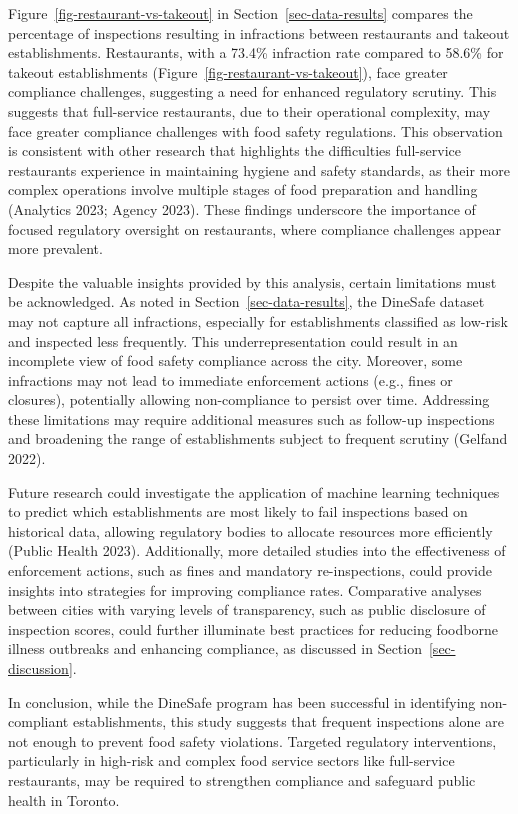 \documentclass[
  letterpaper,
  DIV=11,
  numbers=noendperiod]{scrartcl}
\begin{document}
Figure~\ref{fig-restaurant-vs-takeout} in Section~\ref{sec-data-results}
compares the percentage of inspections resulting in infractions between
restaurants and takeout establishments. Restaurants, with a 73.4\%
infraction rate compared to 58.6\% for takeout establishments
(Figure~\ref{fig-restaurant-vs-takeout}), face greater compliance
challenges, suggesting a need for enhanced regulatory scrutiny. This
suggests that full-service restaurants, due to their operational
complexity, may face greater compliance challenges with food safety
regulations. This observation is consistent with other research that
highlights the difficulties full-service restaurants experience in
maintaining hygiene and safety standards, as their more complex
operations involve multiple stages of food preparation and handling
(Analytics 2023; Agency 2023). These findings underscore the importance
of focused regulatory oversight on restaurants, where compliance
challenges appear more prevalent.

Despite the valuable insights provided by this analysis, certain
limitations must be acknowledged. As noted in
Section~\ref{sec-data-results}, the DineSafe dataset may not capture all
infractions, especially for establishments classified as low-risk and
inspected less frequently. This underrepresentation could result in an
incomplete view of food safety compliance across the city. Moreover,
some infractions may not lead to immediate enforcement actions (e.g.,
fines or closures), potentially allowing non-compliance to persist over
time. Addressing these limitations may require additional measures such
as follow-up inspections and broadening the range of establishments
subject to frequent scrutiny (Gelfand 2022).

Future research could investigate the application of machine learning
techniques to predict which establishments are most likely to fail
inspections based on historical data, allowing regulatory bodies to
allocate resources more efficiently (Public Health 2023). Additionally,
more detailed studies into the effectiveness of enforcement actions,
such as fines and mandatory re-inspections, could provide insights into
strategies for improving compliance rates. Comparative analyses between
cities with varying levels of transparency, such as public disclosure of
inspection scores, could further illuminate best practices for reducing
foodborne illness outbreaks and enhancing compliance, as discussed in
Section~\ref{sec-discussion}.

In conclusion, while the DineSafe program has been successful in
identifying non-compliant establishments, this study suggests that
frequent inspections alone are not enough to prevent food safety
violations. Targeted regulatory interventions, particularly in high-risk
and complex food service sectors like full-service restaurants, may be
required to strengthen compliance and safeguard public health in
Toronto.
\end{document}
